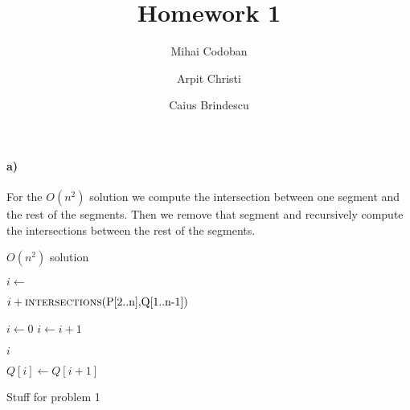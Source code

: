 \documentclass{article}
\title{Homework 1}
\author{Mihai Codoban \and Arpit Christi \and Caius Brindescu}
\begin{document}
\maketitle


\paragraph{a)} 
For the $O(n^2)$ solution we compute the intersection between one segment and the rest of the segments. Then we remove that segment and recursively compute the intersections between the rest of the segments.

\begin{algorithm}
	\caption{$O(n^2)$ solution}
	\begin{algorithmic}
	  	\State $i \gets $  
		\State {} 
	
		\Return $i + \Call{intersections}{$P[2..n]$, $Q[1..n-1]$}$
	  \EndFunction
	
		\State $i \gets 0$
			\State $i \gets i + 1$
		\EndWhile
	
		\Return $i$
	  \EndFunction
	
			\State $Q[i] \gets Q[i + 1]$
		\EndFor
	  \EndFunction
	\end{algorithmic}
\end{algorithm}

Stuff for problem 1



\end{document}
